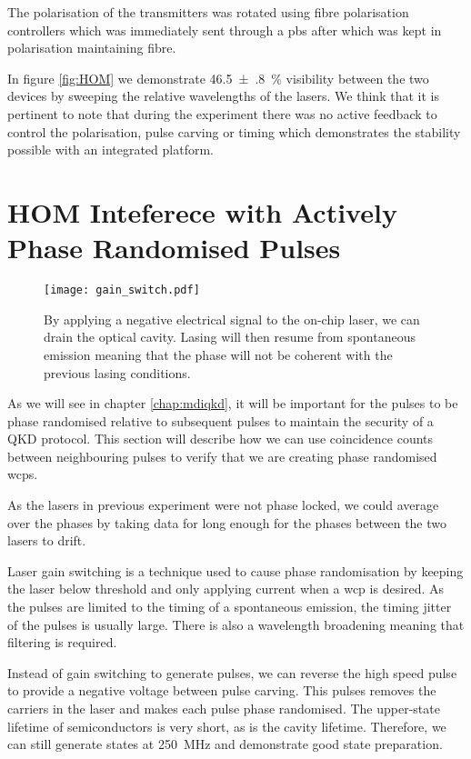 The polarisation of the transmitters was rotated using fibre polarisation controllers which was immediately sent through a \ac{pbs} after which was kept in polarisation maintaining fibre.

In figure \ref{fig:HOM} we demonstrate \SI{46.5(8)}{\percent} visibility between the two devices by sweeping the relative wavelengths of the lasers. We think that it is pertinent to note that during the experiment there was no active feedback to control the polarisation, pulse carving or timing which demonstrates the stability possible with an integrated platform. 

\section{HOM Inteferece with Actively Phase Randomised Pulses}

\begin{figure}[tbp]
	\centering
	\texttt{[image: gain\_switch.pdf]}
	\caption[Gain switching of the on-chip lasers at \SI{250}{MHz}]{By applying a negative electrical signal to the on-chip laser, we can drain the optical cavity. Lasing will then resume from spontaneous emission meaning that the phase will not be coherent with the previous lasing conditions.}
	\label{fig:gain_switch}
\end{figure}

As we will see in chapter \ref{chap:mdiqkd}, it will be important for the pulses to be phase randomised relative to subsequent pulses to maintain the security of a \ac{QKD} protocol. This section will describe how we can use coincidence counts between neighbouring pulses to verify that we are creating phase randomised \acp{wcp}.

As the lasers in previous experiment were not phase locked, we could average over the phases by taking data for long enough for the phases between the two lasers to drift.

Laser gain switching is a technique used to cause phase randomisation by keeping the laser below threshold and only applying current when a \ac{wcp} is desired. As the pulses are limited to the timing of a spontaneous emission, the timing jitter of the pulses is usually large. There is also a wavelength broadening meaning that filtering is required. 

Instead of gain switching to generate pulses, we can reverse the high speed pulse to provide a negative voltage between pulse carving. This pulses removes the carriers in the laser and makes each pulse phase randomised. The upper-state lifetime of semiconductors is very short, as is the cavity lifetime. Therefore, we can still generate states at \SI{250}{MHz} and demonstrate good state preparation.

